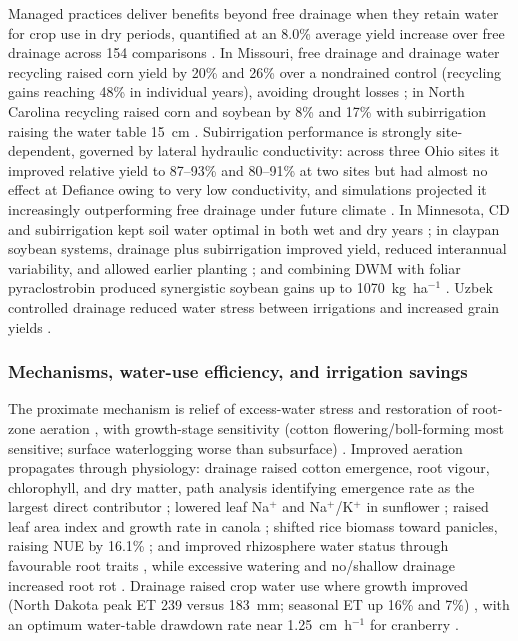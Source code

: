 \documentclass[11pt]{article}
\begin{document}
Managed practices deliver benefits beyond free drainage when they retain water
for crop use in dry periods, quantified at an 8.0\% average yield increase over
free drainage across 154 comparisons \parencite{Singh2022b}. In Missouri, free
drainage and drainage water recycling raised corn yield by 20\% and 26\% over a
nondrained control (recycling gains reaching 48\% in individual years), avoiding
drought losses \parencite{Kaur2021}; in North Carolina recycling raised corn and
soybean by 8\% and 17\% with subirrigation raising the water table 15~cm
\parencite{Moursi2024}. Subirrigation performance is strongly site-dependent,
governed by lateral hydraulic conductivity: across three Ohio sites it improved
relative yield to 87--93\% and 80--91\% at two sites but had almost no effect at
Defiance owing to very low conductivity, and simulations projected it
increasingly outperforming free drainage under future climate
\parencite{Gunn2018,Gunn2019}. In Minnesota, CD and subirrigation kept soil water
optimal in both wet and dry years \parencite{Niaghi2019}; in claypan soybean
systems, drainage plus subirrigation improved yield, reduced interannual
variability, and allowed earlier planting \parencite{Nelson2011}; and combining
DWM with foliar pyraclostrobin produced synergistic soybean gains up to
1070~kg~ha$^{-1}$ \parencite{Nelson2011b}. Uzbek controlled drainage reduced
water stress between irrigations and increased grain yields
\parencite{Dukhovny2018}.

\subsubsection{Mechanisms, water-use efficiency, and irrigation savings}

The proximate mechanism is relief of excess-water stress and restoration of
root-zone aeration \parencite{BENNETT1982,DarziNaftchali2014}, with growth-stage
sensitivity (cotton flowering/boll-forming most sensitive; surface waterlogging
worse than subsurface) \parencite{Qian2021}. Improved aeration propagates through
physiology: drainage raised cotton emergence, root vigour, chlorophyll, and
dry matter, path analysis identifying emergence rate as the largest direct
contributor \parencite{Yang2022}; lowered leaf Na$^+$ and Na$^+$/K$^+$ in
sunflower \parencite{Islam2022}; raised leaf area index and growth rate in canola
\parencite{Asgari2021}; shifted rice biomass toward panicles, raising NUE by
16.1\% \parencite{DarziNaftchali2022b,Qi2025b}; and improved rhizosphere water
status through favourable root traits \parencite{Chen2025b}, while excessive
watering and no/shallow drainage increased root rot \parencite{Han2017}. Drainage
raised crop water use where growth improved (North Dakota peak ET 239 versus
183~mm; seasonal ET up 16\% and 7\%) \parencite{Rijal2012,Yang2017,Yang2022},
with an optimum water-table drawdown rate near 1.25~cm~h$^{-1}$ for cranberry
\parencite{Bulot2017}.
\end{document}
